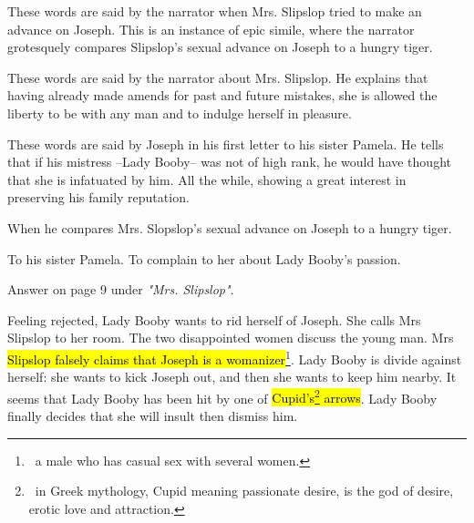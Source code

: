 \documentclass[12pt, a4paper]{article}
\begin{document}


These words are said by the narrator when Mrs. Slipslop tried to make an advance on Joseph. This is an instance
of epic simile, where the narrator grotesquely compares Slipslop's sexual advance on Joseph to a hungry tiger.


These words are said by the narrator about Mrs. Slipslop. He explains that 
having already made amends for past and future mistakes, she is allowed the liberty to be with any man
and to indulge herself in pleasure.


These words are said by Joseph in his first letter to his sister Pamela.
He tells that if his mistress --Lady Booby-- was not of high rank, he would have
thought that she is infatuated by him. All the while, 
showing a great interest in preserving his family reputation.



When he compares Mrs. Slopslop's sexual advance on Joseph to a hungry tiger.


To his sister Pamela. To complain to her about Lady Booby's passion.


Answer on page 9 under \textit{"Mrs. Slipslop"}.

\newpage
{}

\ind Feeling rejected, Lady Booby wants to rid herself of Joseph. She calls
Mrs Slipslop to her room. The two disappointed women discuss the
young man. Mrs \hl{Slipslop falsely claims that Joseph is a womanizer}\footnote{\,
a male who has casual sex with several women.}. Lady Booby is divide against herself:
she wants to kick Joseph out, and then she wants to keep him nearby. It seems that Lady 
Booby has been hit by one of \hl{Cupid's\footnote{\, in Greek mythology, Cupid meaning passionate desire,
is the god of desire, erotic love and attraction.} arrows}. Lady Booby finally decides 
that she will insult then dismiss him.
\end{document}
